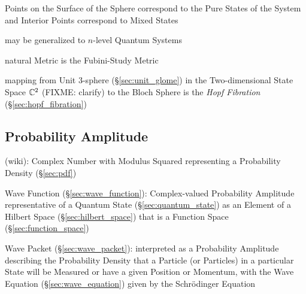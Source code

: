 Points on the Surface of the Sphere correspond to the Pure States of the System
and Interior Points correspond to Mixed States

may be generalized to $n$-level Quantum Systems

natural Metric is the Fubini-Study Metric

mapping from Unit $3$-sphere (\S\ref{sec:unit_glome}) in the Two-dimensional
State Space $\mathbb{C}^2$ (FIXME: clarify) to the Bloch Sphere is the \emph{Hopf
  Fibration} (\S\ref{sec:hopf_fibration})



\subsection{Probability Amplitude}\label{sec:probability_amplitude}

(wiki): Complex Number with Modulus Squared representing a Probability Density
(\S\ref{sec:pdf})

Wave Function (\S\ref{sec:wave_function}): Complex-valued Probability Amplitude
representative of a Quantum State (\S\ref{sec:quantum_state}) as an Element of a
Hilbert Space (\S\ref{sec:hilbert_space}) that is a Function Space
(\S\ref{sec:function_space})

Wave Packet (\S\ref{sec:wave_packet}): interpreted as a Probability Amplitude
describing the Probability Density that a Particle (or Particles) in a
particular State will be Measured or have a given Position or Momentum, with the
Wave Equation (\S\ref{sec:wave_equation}) given by the Schr\"odinger Equation
